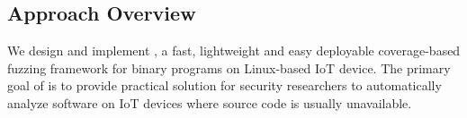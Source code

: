 %
%
%
%
%


\subsection{Approach Overview}

We design and implement {\sysname}, a fast, lightweight and easy deployable coverage-based fuzzing framework for binary programs on Linux-based IoT device. The primary goal of {\sysname} is to provide practical solution for security researchers to automatically analyze software on IoT devices where source code is usually unavailable.

